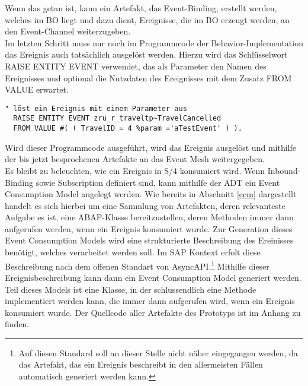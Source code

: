Wenn das getan ist, kann ein Artefakt, das Event-Binding, erstellt werden, welches im \ac{BO} liegt und dazu dient, Ereignisse, die im \ac{BO} erzeugt werden, an den Event-Channel weiterzugeben.\\

Im letzten Schritt muss nur noch im Programmcode der Behavior-Implementation das Ereignis auch tatsächlich ausgelöst werden. Hierzu wird das Schlüsselwort RAISE ENTITY EVENT verwendet, das als Parameter den Namen des Ereignisses und optional die Nutzdaten des Ereignisses mit dem Zusatz FROM VALUE erwartet.\\

\begin{lstlisting}[language=ABAP]
  " löst ein Ereignis mit einem Parameter aus
  RAISE ENTITY EVENT zru_r_traveltp~TravelCancelled
  FROM VALUE #( ( TravelID = 4 %param ='aTestEvent' ) ).
\end{lstlisting}

Wird dieser Programmcode ausgeführt, wird das Ereignis ausgelöst und mithilfe der bis jetzt besprochenen Artefakte an das Event Mesh weitergegeben.\\

Es bleibt zu beleuchten, wie ein Ereignis in S/4 konsumiert wird. Wenn Inbound-Binding sowie Subscription definiert sind, kann mithilfe der \ac{ADT} ein Event Consumption Model angelegt werden. Wie bereits in Abschnitt \ref{ecm} dargestellt handelt es sich hierbei um eine Sammlung von Artefakten, deren relevanteste Aufgabe es ist, eine \ac{ABAP}-Klasse bereitzustellen, deren Methoden immer dann aufgerufen werden, wenn ein Ereignis konsumiert wurde. Zur Generation dieses Event Consumption Models wird eine strukturierte Beschreibung des Ereinisses benötigt, welches verarbeitet werden soll. Im SAP Kontext erfolt diese Beschreibung nach dem offenen Standart von AsyncAPI.\footnote{Auf diesen Standard soll an dieser Stelle nicht näher eingegangen werden, da das Artefakt, das ein Ereignis beschreibt in den allermeisten Fällen automatisch generiert werden kann.} Mithilfe dieser Ereignisbeschreibung kann dann ein Event Consumption Model generiert werden. Teil dieses Models ist eine Klasse, in der schlussendlich eine Methode implementiert werden kann, die immer dann aufgerufen wird, wenn ein Ereignis konsumiert wurde. Der Quellcode aller Artefakte des Prototyps ist im Anhang zu finden.\\

